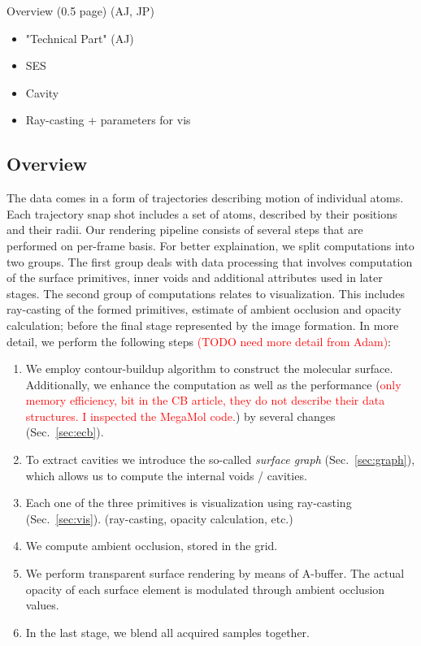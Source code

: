 Overview (0.5 page) (AJ, JP)
\begin{itemize}
  \item "Technical Part" (AJ)
  \item SES
  \item Cavity
  \item Ray-casting + parameters for vis
\end{itemize}

\subsection{Overview}

The data comes in a form of trajectories describing motion of individual atoms. Each trajectory snap shot includes a set of atoms, described by their positions and their radii. Our rendering pipeline consists of several steps that are performed on per-frame basis. 
For better explaination, we split computations into two groups. The first group deals with data processing that involves computation of the surface primitives, inner voids and additional attributes used in later stages. The second group of computations relates to visualization. This includes ray-casting of the formed primitives, estimate of ambient occlusion and opacity calculation; before the final stage represented by the image formation. In more detail, we perform the following steps \textcolor{red}{(TODO need more detail from Adam)}:
	\begin{enumerate}
	  \item We employ contour-buildup algorithm to construct the molecular surface. Additionally, we enhance the computation as well as the performance (\textcolor{red}{only memory efficiency, bit in the CB article, they do not describe their data structures. I inspected the MegaMol code.}) by several changes (Sec.~\ref{sec:ecb}).
		\item To extract cavities we introduce the so-called \textit{surface graph} (Sec.~\ref{sec:graph}), which allows us to compute the internal voids / cavities.
		\item Each one of the three primitives is visualization using ray-casting (Sec.~\ref{sec:vis}). (ray-casting, opacity calculation, etc.)
		\item We compute ambient occlusion, stored in the grid.
		\item We perform transparent surface rendering by means of A-buffer. The actual opacity of each surface element is modulated through ambient occlusion values.
		\item In the last stage, we blend all acquired samples together.
	\end{enumerate}

